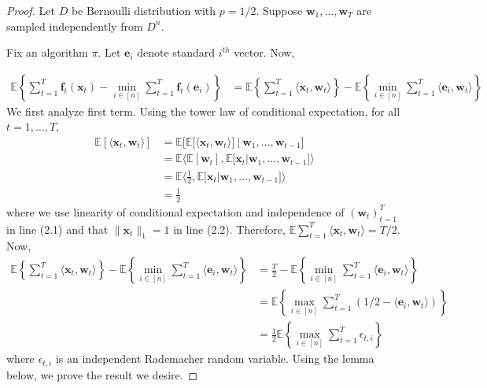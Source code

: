 \documentclass[12pt, a4paper]{report}
\begin{document}
\begin{proof}
Let $D$ be Bernoulli distribution with $p=1/2$. Suppose $\mathbf{w}_1, \dots, \mathbf{w}_T$ are sampled independently from $D^n$. 

Fix an algorithm $\pi$. Let $\mathbf{e}_i$ denote standard $i^{th}$ vector. Now,

\begin{align*}
    \mathbb{E} \left\{ \sum_{t=1}^T \mathbf{f}_t(\mathbf{x}_t) - \min_{i \in [n]} \sum_{t=1}^T \mathbf{f}_t(\mathbf{e}_i) \right\} &= \mathbb{E} \left\{\sum_{t=1}^T \langle \mathbf{x}_t, \mathbf{w}_t \rangle \right\} - \mathbb{E} \left\{\min_{i \in [n]} \sum_{t=1}^T \langle \mathbf{e}_i, \mathbf{w}_t \rangle \right\}
\end{align*}
We first analyze first term. Using the tower law of conditional expectation, for all $t = 1, \dots, T$,
\begin{align}
    \mathbb{E} [\langle \mathbf{x}_t, \mathbf{w}_t \rangle] &= 
    \mathbb{E} \Big[\mathbb{E} \Big[\langle \mathbf{x}_t, \mathbf{w}_t \rangle \Big]\ \Big|\ \mathbf{w}_1, \dots, \mathbf{w}_{t-1} \Big] \nonumber
    \\ 
    &= \mathbb{E} \Big\langle \mathbb{E} [\mathbf{w}_t], \mathbb{E}  \big[\mathbf{x}_t \big| \mathbf{w}_1, \dots, \mathbf{w}_{t-1} \big] \Big\rangle \nonumber
    \\
    &= \mathbb{E} \Big\langle \frac{1}{2}, \mathbb{E} \big[\mathbf{x}_t \big| \mathbf{w}_1, \dots, \mathbf{w}_{t-1} \big] \Big\rangle 
    \\
    &= \frac{1}{2}
\end{align}
where we use linearity of conditional expectation and independence of $(\mathbf{w}_t)_{t=1}^T$ in line (2.1) and that $\lVert \mathbf{x}_t \rVert_1 = 1$ in line (2.2). Therefore,  $\mathbb{E} \sum_{t=1}^T \langle \mathbf{x}_t, \mathbf{w}_t \rangle = T/2$. Now, 
\begin{align*}
    \mathbb{E} \left\{\sum_{t=1}^T \langle \mathbf{x}_t, \mathbf{w}_t \rangle \right\} - \mathbb{E} \left\{\min_{i \in [n]} \sum_{t=1}^T \langle \mathbf{e}_i, \mathbf{w}_t \rangle \right\} &= \frac{T}{2} - \mathbb{E} \left\{ \min_{i \in [n]} \sum_{t=1}^T \langle \mathbf{e}_i, \mathbf{w}_t \rangle \right\}
    \\
    &= \mathbb{E} \left\{ \max_{i \in [n]} \sum_{t=1}^T (1/2 - \langle \mathbf{e}_i, \mathbf{w}_t \rangle)\right\}
    \\
    &= \frac{1}{2} \mathbb{E} \left\{ \max_{i \in [n]} \sum_{t=1}^T \epsilon_{t, i} \right\}
\end{align*}
where $\epsilon_{t, i}$ is an independent Rademacher random variable. Using the lemma below, we prove the result we desire.
\end{proof}
\end{document}
